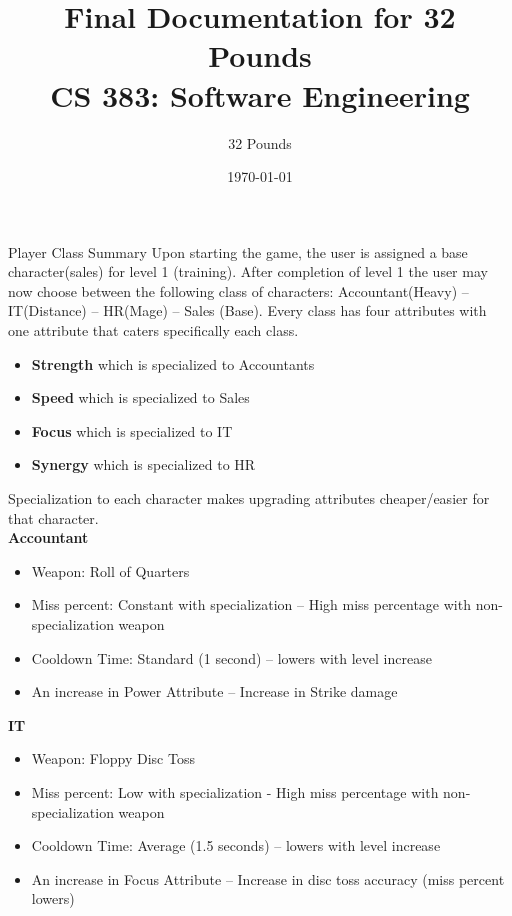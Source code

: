 \documentclass[12pt]{report}
\begin{document}
\title{Final Documentation for 32 Pounds\\ \vspace{2 mm} {\large CS 383: Software Engineering}}

\author{32 Pounds}
\date{\today}
\maketitle
\clearpage

\begin{chapter}{Player Class Summary}
 Upon starting the game, the user is assigned a base character(sales) for level 1 (training). After completion of level 1 the user may now choose between the following class of characters: Accountant(Heavy) -- IT(Distance) -- HR(Mage) -- Sales (Base).  Every class has four attributes with one attribute that caters specifically each class.\\ 
	\begin{itemize}
	 \item \textbf{Strength} which is specialized to Accountants\\ 
	 \item \textbf{Speed} which is specialized to Sales\\ 
	 \item \textbf{Focus} which is specialized to IT\\ 
	 \item \textbf{Synergy} which is specialized to HR\\  
	\end{itemize}
	Specialization to each character makes upgrading attributes cheaper/easier for that character.\\

	\textbf{\large{Accountant}}
	\begin{itemize}
  	 \item Weapon: Roll of Quarters
	 \item Miss percent: Constant with specialization -- High miss percentage with non-specialization weapon
  	 \item Cooldown Time: Standard (1 second) -- lowers with level increase %
  	 \item An increase in Power Attribute -- Increase in Strike damage \\
	\end{itemize}

	\textbf{\large{IT}} 
	\begin{itemize}
  	 \item Weapon: Floppy Disc Toss
  	 \item Miss percent: Low with specialization - High miss percentage with non-specialization weapon
  	 \item Cooldown Time: Average (1.5 seconds) -- lowers with level increase
         \item An increase in Focus Attribute -- Increase in disc toss accuracy (miss percent lowers)\\
	\end{itemize}


\end{chapter}
\end{document}
